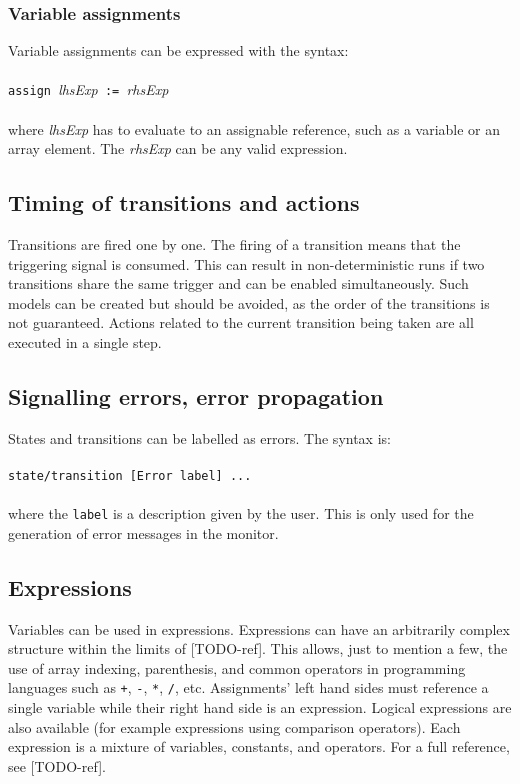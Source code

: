   \subsubsection{Variable assignments}
Variable assignments can be expressed with the syntax:
\\\\\verb!assign !\textit{lhsExp}\verb! := !\textit{rhsExp}\\\\
where \textit{lhsExp} has to evaluate to an assignable reference, such as a variable or an array element. The \textit{rhsExp} can be any valid expression.
  \subsection{Timing of transitions and actions}
Transitions are fired one by one. The firing of a transition means that the triggering signal is consumed. This can result in non-deterministic runs if two transitions share the same trigger and can be enabled simultaneously. Such models can be created but should be avoided, as the order of the transitions is not guaranteed. Actions related to the current transition being taken are all executed in a single step.
  \subsection{Signalling errors, error propagation}
States and transitions can be labelled as errors. The syntax is:
\\\\\verb!state/transition [Error label] ...!\\\\
where the \verb!label! is a description given by the user. This is only used for the generation of error messages in the monitor.
  \subsection{Expressions}
Variables can be used in expressions. Expressions can have an arbitrarily complex structure within the limits of [TODO-ref]. This allows, just to mention a few, the use of array indexing, parenthesis, and common operators in programming languages such as \verb!+!, \verb!-!, \verb!*!, \verb!/!, etc. Assignments' left hand sides must reference a single variable while their right hand side is an expression. Logical expressions are also available (for example expressions using comparison operators). Each expression is a mixture of variables, constants, and operators. For a full reference, see [TODO-ref].
